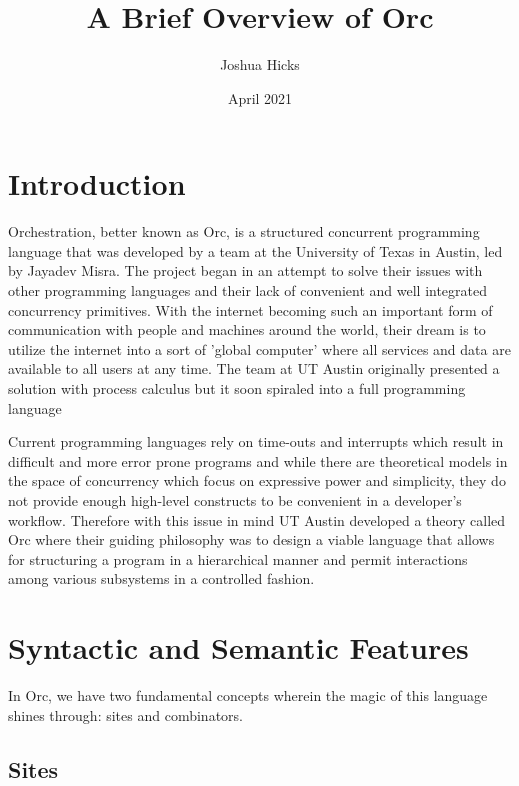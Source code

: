 \documentclass[12pt, letterpaper]{article}
\title{A Brief Overview of Orc}
\author{Joshua Hicks}
\date{April 2021}
\begin{document}
\begin{titlingpage}
  \maketitle
\end{titlingpage}
\tableofcontents
\newpage
\section{Introduction}

Orchestration, better known as Orc, is a structured concurrent programming language that was developed by a team at the University of Texas in Austin, led by Jayadev Misra.  The project began in an attempt to solve their issues with other programming languages and their lack of convenient and well integrated concurrency primitives.  With the internet becoming such an important form of communication with people and machines around the world, their dream is to utilize the internet into a sort of 'global computer' where all services and data are available to all users at any time\cite{Cook2008}.  The team at UT Austin originally presented a solution with process calculus but it soon spiraled into a full programming language\cite{Kitchin2009}

Current programming languages rely on time-outs and interrupts which result in difficult and more error prone programs and while there are theoretical models in the space of concurrency which focus on expressive power and simplicity, they do not provide enough high-level constructs to be convenient in a developer's workflow. Therefore with this issue in mind UT Austin developed a theory called Orc where their guiding philosophy was to design a viable language that allows for structuring a program in a hierarchical manner and permit interactions among various subsystems in a controlled fashion\cite{Cook2008}.

\section{Syntactic and Semantic Features}
In Orc, we have two fundamental concepts wherein the magic of this language shines through: sites and combinators.  

\subsection{Sites}
\end{document}
